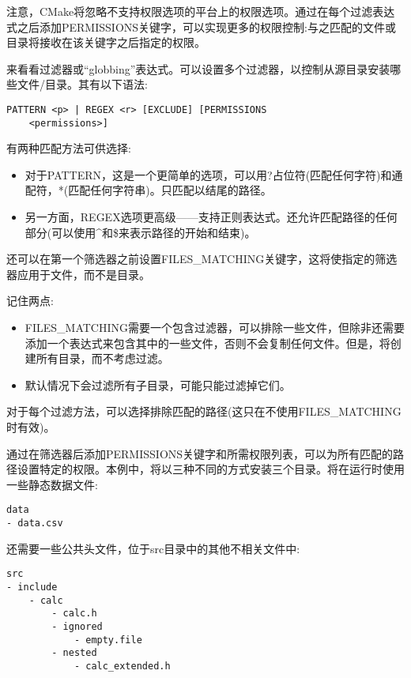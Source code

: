 注意，CMake将忽略不支持权限选项的平台上的权限选项。通过在每个过滤表达式之后添加PERMISSIONS关键字，可以实现更多的权限控制:与之匹配的文件或目录将接收在该关键字之后指定的权限。

来看看过滤器或“globbing”表达式。可以设置多个过滤器，以控制从源目录安装哪些文件/目录。其有以下语法:

\begin{lstlisting}[style=styleCMake]
PATTERN <p> | REGEX <r> [EXCLUDE] [PERMISSIONS
	<permissions>]
\end{lstlisting}

有两种匹配方法可供选择:

\begin{itemize}
\item 
对于PATTERN，这是一个更简单的选项，可以用?占位符(匹配任何字符)和通配符，*(匹配任何字符串)。只匹配以结尾的路径。

\item 
另一方面，REGEX选项更高级——支持正则表达式。还允许匹配路径的任何部分(可以使用\^{}和\$来表示路径的开始和结束)。
\end{itemize}

还可以在第一个筛选器之前设置FILES\_MATCHING关键字，这将使指定的筛选器应用于文件，而不是目录。

记住两点:

\begin{itemize}
\item 
FILES\_MATCHING需要一个包含过滤器，可以排除一些文件，但除非还需要添加一个表达式来包含其中的一些文件，否则不会复制任何文件。但是，将创建所有目录，而不考虑过滤。

\item 
默认情况下会过滤所有子目录，可能只能过滤掉它们。
\end{itemize}

对于每个过滤方法，可以选择排除匹配的路径(这只在不使用FILES\_MATCHING时有效)。

通过在筛选器后添加PERMISSIONS关键字和所需权限列表，可以为所有匹配的路径设置特定的权限。本例中，将以三种不同的方式安装三个目录。将在运行时使用一些静态数据文件:

\begin{lstlisting}[style=stylePython]
data
- data.csv
\end{lstlisting}

还需要一些公共头文件，位于src目录中的其他不相关文件中:

\begin{lstlisting}[style=stylePython]
src
- include
	- calc
		- calc.h
		- ignored
			- empty.file
		- nested
			- calc_extended.h
\end{lstlisting}

